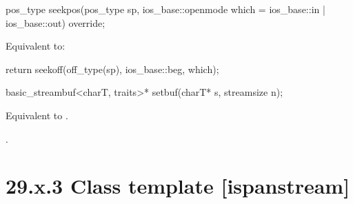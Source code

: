 \documentclass[ebook,11pt,article]{memoir}
\begin{document}
\begin{itemdecl}
pos_type seekpos(pos_type sp,
                 ios_base::openmode which
                   = ios_base::in | ios_base::out) override;
\end{itemdecl}

\begin{itemdescr}
\pnum
\effects
Equivalent to: 
\begin{codeblock}
return seekoff(off_type(sp), ios_base::beg, which);
\end{codeblock}
\end{itemdescr}

\begin{itemdecl}
basic_streambuf<charT, traits>* setbuf(charT* s, streamsize n);
\end{itemdecl}

\begin{itemdescr}
\pnum
\effects
Equivalent to
.

\pnum
\returns
{}.
\end{itemdescr} 

\section{29.x.3 Class template  [ispanstream] }
\end{document}
